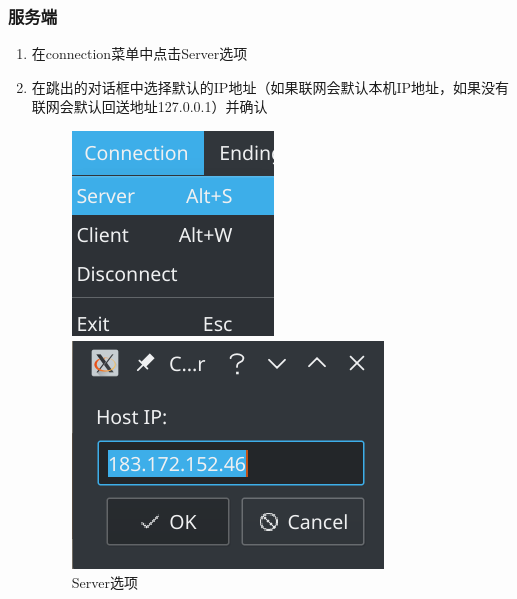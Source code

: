 \documentclass[a4paper,10pt]{article}
\begin{document}
                \subsubsection{服务端}
                        \begin{enumerate}
                                \item 在connection菜单中点击Server选项
                                \item 在跳出的对话框中选择默认的IP地址（如果联网会默认本机IP地址，如果没有联网会默认回送地址127.0.0.1）并确认
                                        \begin{figure}[htbp]
                                                \centering
                                                \begin{minipage}{.3\textwidth}
                                                        \centering
                                                        \includegraphics[width=.7\textwidth]{server.png}
                                                        \caption{Server选项}
                                                        \label{fig5}
                                                \end{minipage}
                                                \begin{minipage}{.3\textwidth}
                                                        \centering
                                                        \includegraphics[width=.7\textwidth]{serverip.png}

\end{minipage}
\end{figure}
\end{enumerate}
\end{document}
